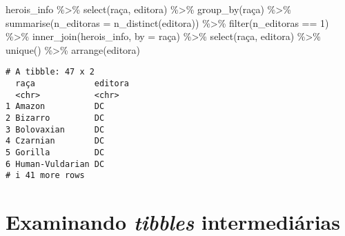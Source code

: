 \documentclass[
  letterpaper,
  DIV=11,
  numbers=noendperiod]{scrreprt}
\newenvironment{Shaded}{\begin{snugshade}}{\end{snugshade}}
\newcommand{\AttributeTok}[1]{\textcolor[rgb]{0.40,0.45,0.13}{#1}}
\newcommand{\DecValTok}[1]{\textcolor[rgb]{0.68,0.00,0.00}{#1}}
\newcommand{\FunctionTok}[1]{\textcolor[rgb]{0.28,0.35,0.67}{#1}}
\newcommand{\NormalTok}[1]{\textcolor[rgb]{0.00,0.23,0.31}{#1}}
\newcommand{\SpecialCharTok}[1]{\textcolor[rgb]{0.37,0.37,0.37}{#1}}
\newcommand{\StringTok}[1]{\textcolor[rgb]{0.13,0.47,0.30}{#1}}
\begin{document}
\begin{enumerate}
\begin{tcolorbox}
\begin{itemize}
\begin{Shaded}
\begin{Highlighting}[]
\NormalTok{herois\_info }\SpecialCharTok{\%\textgreater{}\%} 
  \FunctionTok{select}\NormalTok{(raça, editora) }\SpecialCharTok{\%\textgreater{}\%} 
  \FunctionTok{group\_by}\NormalTok{(raça) }\SpecialCharTok{\%\textgreater{}\%} 
  \FunctionTok{summarise}\NormalTok{(}\AttributeTok{n\_editoras =} \FunctionTok{n\_distinct}\NormalTok{(editora)) }\SpecialCharTok{\%\textgreater{}\%} 
  \FunctionTok{filter}\NormalTok{(n\_editoras }\SpecialCharTok{==} \DecValTok{1}\NormalTok{) }\SpecialCharTok{\%\textgreater{}\%} 
  \FunctionTok{inner\_join}\NormalTok{(herois\_info, }\AttributeTok{by =} \StringTok{\textquotesingle{}raça\textquotesingle{}}\NormalTok{) }\SpecialCharTok{\%\textgreater{}\%} 
  \FunctionTok{select}\NormalTok{(raça, editora) }\SpecialCharTok{\%\textgreater{}\%} 
  \FunctionTok{unique}\NormalTok{() }\SpecialCharTok{\%\textgreater{}\%} 
  \FunctionTok{arrange}\NormalTok{(editora)}
\end{Highlighting}
\end{Shaded}

\begin{verbatim}
# A tibble: 47 x 2
  raça            editora
  <chr>           <chr>  
1 Amazon          DC     
2 Bizarro         DC     
3 Bolovaxian      DC     
4 Czarnian        DC     
5 Gorilla         DC     
6 Human-Vuldarian DC     
# i 41 more rows
\end{verbatim}
  \end{itemize}

  \end{tcolorbox}
\end{enumerate}

\section{\texorpdfstring{Examinando \emph{tibbles}
intermediárias}{Examinando tibbles intermediárias}}\label{examinando-tibbles-intermediuxe1rias}
\end{document}
